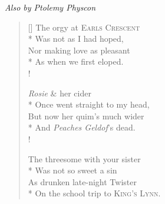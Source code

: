 \begin{center}
{\it Also by Ptolemy Physcon}
\end{center}

\bigskip
\bigskip

\begin{verse}[\versewidth]
The orgy at \textsc{Earls Crescent}\\*
\vin Was not as I had hoped,\\
Nor making love as pleasant\\*
\vin As when we first eloped.\\!

\textit{Rosie} \& her cider\\*
\vin Once went straight to my head,\\
But now her quim's much wider\\*
\vin And \textit{Peaches Geldof}'s dead.\\!

The threesome with your sister\\*
\vin Was not so sweet a sin\\
As drunken late-night Twister\\*
\vin On the school trip to \textsc{King's Lynn}.
\end{verse}
